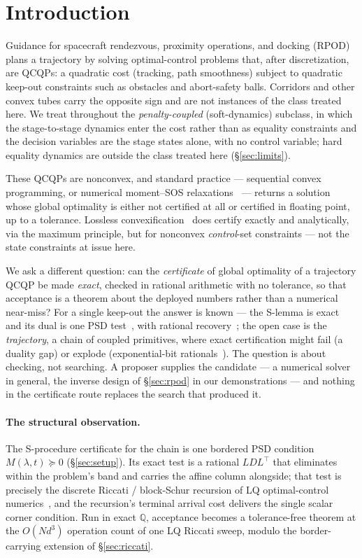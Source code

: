 \documentclass[11pt]{article}
\theoremstyle{definition}
\theoremstyle{remark}
\newcommand{\Q}{\mathbb{Q}}
\renewcommand{\_}{\ifdim\fontdimen3\font=0pt\relax\char`\_\else\textunderscore\fi\hspace{0pt}}
\begin{document}
\section{Introduction}\label{sec:intro}
Guidance for spacecraft rendezvous, proximity operations, and docking (RPOD)
plans a trajectory by solving optimal-control problems that, after
discretization, are QCQPs: a quadratic cost (tracking, path smoothness) subject
to quadratic keep-out constraints such as obstacles and abort-safety balls.
Corridors and other convex tubes carry the opposite sign and are not instances
of the class treated here. We treat throughout the \emph{penalty-coupled}
(soft-dynamics) subclass, in which the stage-to-stage dynamics enter the cost
rather than as equality constraints and the decision variables are the stage
states alone, with no control variable; hard equality dynamics are outside the
class treated here (\S\ref{sec:limits}).

These QCQPs are nonconvex, and standard practice --- sequential convex
programming, or numerical moment--SOS
relaxations~\cite{lasserre2001,strom2024,yang2023perception} --- returns a
solution whose global optimality is either not certified at all or certified in
floating point, up to a tolerance. Lossless
convexification~\cite{acikmese2011} does certify exactly and analytically, via
the maximum principle, but for nonconvex \emph{control}-set constraints --- not
the state constraints at issue here.

We ask a different question: can the \emph{certificate} of global optimality of
a trajectory QCQP be made \emph{exact}, checked in rational arithmetic with no
tolerance, so that acceptance is a theorem about the deployed numbers rather
than a numerical near-miss? For a single keep-out the answer is known --- the
S-lemma is exact and its dual is one PSD
test~\cite{polik2007,yakubovich1971}, with rational
recovery~\cite{peyrl2008,kaltofen2012}; the open case is the \emph{trajectory},
a chain of coupled primitives, where exact certification might fail (a duality
gap) or explode (exponential-bit rationals~\cite{bienstock2020}).
The question is about checking, not searching. A proposer supplies the
candidate --- a numerical solver in general, the inverse design of
\S\ref{sec:rpod} in our demonstrations --- and nothing in the certificate
route replaces the search that produced it.

\paragraph{The structural observation.} The S-procedure certificate for the
chain is one bordered PSD condition $M(\lambda,t)\succeq0$ (\S\ref{sec:setup}).
Its exact test is a rational $LDL^\top$ that eliminates within the problem's
band and carries the affine column alongside; that test is precisely the
discrete Riccati / block-Schur recursion of LQ optimal-control
numerics~\cite{wright1993,rao1998}, and the recursion's terminal arrival cost
delivers the single scalar corner condition. Run in exact $\Q$, acceptance
becomes a tolerance-free theorem at the $O(Nd^3)$ operation count of one LQ
Riccati sweep, modulo the border-carrying extension of \S\ref{sec:riccati}.
\end{document}
